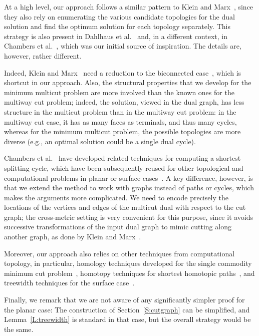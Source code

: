\documentclass[11pt]{article}
\theoremstyle{plain}  \newtheorem{theorem}{Theorem}[section]
\theoremstyle{definition}
\begin{document}
At a high level, our approach follows a similar pattern to Klein and
Marx~\cite{km-spktc-12}, since they also rely on enumerating the various
candidate topologies for the dual solution and find the optimum solution
for each topology separately.  This strategy is also present in Dahlhaus et
al.~\cite{djpsy-cmc-94} and, in a different context, in Chambers et
al.~\cite{ccelw-scsh-08}, which was our initial source of inspiration.  The
details are, however, rather different.

Indeed, Klein and Marx~\cite{km-spktc-12} need a reduction to the
biconnected case~\cite[Section~3]{km-spktc-12}, which is shortcut in our
approach.  Also, the structural properties that we develop for the minimum
multicut problem are more involved than the known ones for the multiway cut
problem; indeed, the solution, viewed in the dual graph, has less structure
in the multicut problem than in the multiway cut problem: in the multiway
cut case, it has as many faces as terminals, and thus many cycles, whereas
for the minimum multicut problem, the possible topologies are more diverse
(e.g., an optimal solution could be a single dual cycle).

Chambers et al.~\cite{ccelw-scsh-08} have developed related techniques for
computing a shortest splitting cycle, which have been subsequently reused
for other topological and computational problems in planar or surface
cases~\cite{en-sncwp-11,cen-mcshc-09,f-sntcd-13}.  A key difference,
however, is that we extend the method to work with graphs instead of paths
or cycles, which makes the arguments more complicated.  We need to encode
precisely the locations of the vertices and edges of the multicut dual with
respect to the cut graph; the cross-metric setting is very convenient for
this purpose, since it avoids successive transformations of the input dual
graph to mimic cutting along another graph, as done by Klein and
Marx~\cite{km-spktc-12}.

Moreover, our approach also relies on other techniques from computational
topology, in particular, homology techniques developed for the single
commodity minimum cut problem~\cite{cen-mcshc-09}, homotopy techniques for
shortest homotopic paths~\cite{ce-tnpcs-10,k-csntc-06}, and treewidth
techniques for the surface case~\cite{e-dgteg-03}.

Finally, we remark that we are not aware of any significantly simpler proof
for the planar case: The construction of Section~\ref{S:cutgraph} can be
simplified, and Lemma~\ref{L:treewidth} is standard in that case, but the
overall strategy would be the same.
\end{document}
